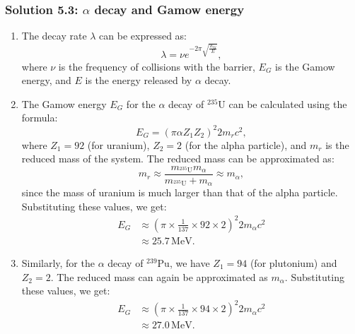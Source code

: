 \subsubsection*{Solution 5.3: $\alpha$ decay and Gamow energy}
\begin{enumerate}[label=(\alph*)]
    \item The decay rate $\lambda$ can be expressed as:
    \begin{equation*}
    \lambda = \nu e^{-2\pi \sqrt{\frac{E_G}{E}}},
    \end{equation*}
    where $\nu$ is the frequency of collisions with the barrier, $E_G$ is the Gamow energy, and $E$ is the energy released by $\alpha$ decay.
    
    \item The Gamow energy $E_G$ for the $\alpha$ decay of $^{235}\text{U}$ can be calculated using the formula:
    \begin{equation}
    E_G = (\pi \alpha Z_1 Z_2)^2 2 m_{r}c^2,
    \end{equation}
    where $Z_1 = 92$ (for uranium), $Z_2 = 2$ (for the alpha particle), and $m_r$ is the reduced mass of the system. The reduced mass can be approximated as:
    \begin{equation}
    m_r \approx \frac{m_{^{235}\text{U}} m_{\alpha}}{m_{^{235}\text{U}} + m_{\alpha}} \approx m_{\alpha},
    \end{equation}
    since the mass of uranium is much larger than that of the alpha particle. Substituting these values, we get:
    \begin{align*}
    E_G &\approx (\pi \times \frac{1}{137} \times 92 \times 2)^2 2 m_{\alpha} c^2 \\
        &\approx 25.7\,\text{MeV}.
    \end{align*}
    
    \item Similarly, for the $\alpha$ decay of $^{239}\text{Pu}$, we have $Z_1 = 94$ (for plutonium) and $Z_2 = 2$. The reduced mass can again be approximated as $m_{\alpha}$. Substituting these values, we get:
    \begin{align*}
    E_G &\approx (\pi \times \frac{1}{137} \times 94 \times 2)^2 2 m_{\alpha} c^2 \\
        &\approx 27.0\,\text{MeV}.
    \end{align*}
    

\end{enumerate}

